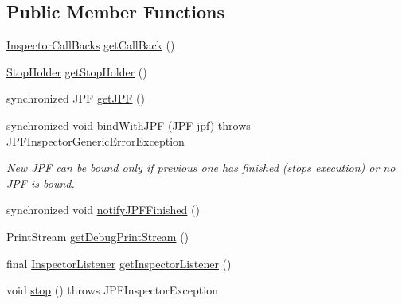 \subsection*{Public Member Functions}
\begin{DoxyCompactItemize}
\item 
\hyperlink{interfacegov_1_1nasa_1_1jpf_1_1inspector_1_1interfaces_1_1_inspector_call_backs}{Inspector\+Call\+Backs} \hyperlink{classgov_1_1nasa_1_1jpf_1_1inspector_1_1server_1_1jpf_1_1_j_p_f_inspector_aa162cc3bac2d88c62d170d036c5e1ccc}{get\+Call\+Back} ()
\item 
\hyperlink{classgov_1_1nasa_1_1jpf_1_1inspector_1_1server_1_1jpf_1_1_stop_holder}{Stop\+Holder} \hyperlink{classgov_1_1nasa_1_1jpf_1_1inspector_1_1server_1_1jpf_1_1_j_p_f_inspector_ae952010e74e90389ddb3cef055a0d592}{get\+Stop\+Holder} ()
\item 
synchronized J\+PF \hyperlink{classgov_1_1nasa_1_1jpf_1_1inspector_1_1server_1_1jpf_1_1_j_p_f_inspector_a477c3ffc6d31e17de09b335f801ad902}{get\+J\+PF} ()
\item 
synchronized void \hyperlink{classgov_1_1nasa_1_1jpf_1_1inspector_1_1server_1_1jpf_1_1_j_p_f_inspector_a7bdbd7beca9adc2c57e0f01b295655bb}{bind\+With\+J\+PF} (J\+PF \hyperlink{classgov_1_1nasa_1_1jpf_1_1inspector_1_1server_1_1jpf_1_1_j_p_f_inspector_a04fbb7b09b55ee2c777428d3833fc353}{jpf})  throws J\+P\+F\+Inspector\+Generic\+Error\+Exception 
\begin{DoxyCompactList}\small\item\em New J\+PF can be bound only if previous one has finished (stops execution) or no J\+PF is bound. \end{DoxyCompactList}\item 
synchronized void \hyperlink{classgov_1_1nasa_1_1jpf_1_1inspector_1_1server_1_1jpf_1_1_j_p_f_inspector_adc9af08362ed367182a0ae89bb96f92f}{notify\+J\+P\+F\+Finished} ()
\item 
Print\+Stream \hyperlink{classgov_1_1nasa_1_1jpf_1_1inspector_1_1server_1_1jpf_1_1_j_p_f_inspector_ab936b10b647a6262639d6474fcba6a16}{get\+Debug\+Print\+Stream} ()
\item 
final \hyperlink{classgov_1_1nasa_1_1jpf_1_1inspector_1_1server_1_1jpf_1_1_inspector_listener}{Inspector\+Listener} \hyperlink{classgov_1_1nasa_1_1jpf_1_1inspector_1_1server_1_1jpf_1_1_j_p_f_inspector_abecd4143627640215d6f2db707718b03}{get\+Inspector\+Listener} ()
\item 
void \hyperlink{interfacegov_1_1nasa_1_1jpf_1_1inspector_1_1interfaces_1_1_commands_interface_a4dc6ea27e2df05a4f16dfd357dec0acf}{stop} ()  throws J\+P\+F\+Inspector\+Exception

\end{DoxyCompactItemize}
